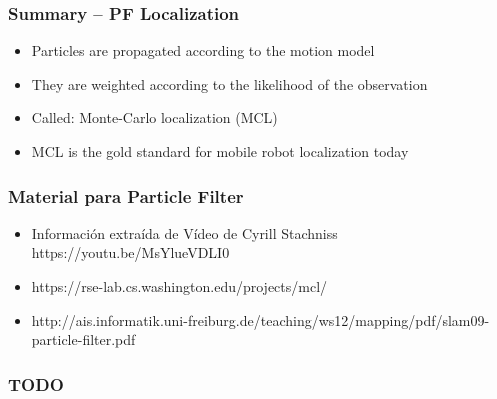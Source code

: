     \begin{frame}
    \frametitle{Summary – PF Localization}
    \begin{itemize}
        \item Particles are propagated according to the motion model
        \item They are weighted according to the likelihood of the observation
        \item Called: Monte-Carlo localization (MCL)
        \item MCL is the gold standard for mobile robot localization today
    \end{itemize}
    \end{frame}

\begin{frame}
    \frametitle{Material para Particle Filter}
    
    \begin{itemize}
        \item Información extraída de Vídeo de Cyrill Stachniss https://youtu.be/MsYlueVDLI0
        \item https://rse-lab.cs.washington.edu/projects/mcl/
        \item http://ais.informatik.uni-freiburg.de/teaching/ws12/mapping/pdf/slam09-particle-filter.pdf
    \end{itemize}
   
\end{frame}


\begin{frame}
    \frametitle{TODO}
    
    
    
\end{frame}


    

